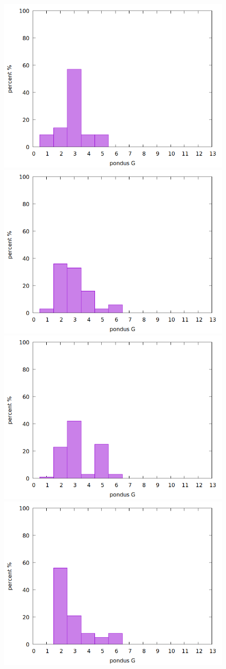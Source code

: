 \documentclass{beamer}
\begin{document}
\begin{frame}
\begin{figure}
			\includegraphics[width=.19\textwidth]{../../Data/I-V/I-V_190_2021_03_04/stat.png}
			\includegraphics[width=.19\textwidth]{../../Data/I-V/I-V_194_2021_03_04/stat.png}
			\includegraphics[width=.19\textwidth]{../../Data/I-V/I-V_195_2021_03_04/stat.png}
			\includegraphics[width=.19\textwidth]{../../Data/I-V/I-V_198_2021_03_04/stat.png}
		\end{figure}
\end{frame}
\end{document}
